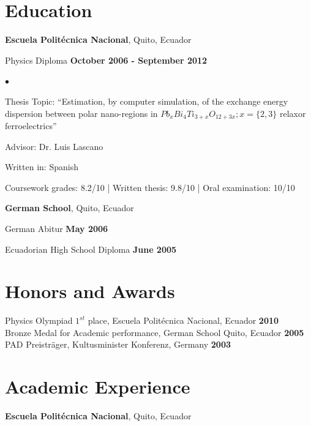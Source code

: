 \documentclass[margin,line]{res}
\newenvironment{list1}{
  \begin{list}{\ding{113}}{%
      \setlength{\itemsep}{0in}
      \setlength{\parsep}{0in} \setlength{\parskip}{0in}
      \setlength{\topsep}{0in} \setlength{\partopsep}{0in} 
      \setlength{\leftmargin}{0.17in}}}{\end{list}}
\newenvironment{list2}{
  \begin{list}{$\bullet$}{%
      \setlength{\itemsep}{0in}
      \setlength{\parsep}{0in} \setlength{\parskip}{0in}
      \setlength{\topsep}{0in} \setlength{\partopsep}{0in} 
      \setlength{\leftmargin}{0.2in}}}{\end{list}}
\begin{document}
\begin{resume}
\section{\sc Education}
  {\bf Escuela Politécnica Nacional}, Quito, Ecuador\\
  \vspace{-.1in}
  \begin{list1}
    \item[] Physics Diploma \hfill {\bf October 2006 - September 2012}\\
    \begin{list2}
    \vspace{-.1in}
      \item Thesis Topic:  ``Estimation, by computer simulation, of the exchange
	energy dispersion between polar nano-regions in $Pb_xBi_4Ti_{3+x}O_{12+3x}; x=\{2,3\}$
	relaxor ferroelectrics''
      \item Advisor: Dr. Luis Lascano
      \item Written in: Spanish
      \item Coursework grades: 8.2/10 | Written thesis: 9.8/10 | Oral examination: 10/10
    \end{list2}
  \end{list1}

  {\bf German School}, Quito, Ecuador\\
  \vspace{-.1in}
  \begin{list1}
    \item[] German Abitur \hfill {\bf May 2006}
    \item[] Ecuadorian High School Diploma \hfill {\bf June 2005}
  \end{list1}

\section{\sc Honors and Awards}
  Physics Olympiad $1^{st}$ place, Escuela Politécnica Nacional, Ecuador \hfill {\bf 2010}\\
  Bronze Medal for Academic performance, German School Quito, Ecuador \hfill {\bf 2005}\\
  PAD Preisträger, Kultusminister Konferenz, Germany \hfill {\bf 2003}

\section{\sc Academic Experience}
  {\bf Escuela Politécnica Nacional}, Quito, Ecuador
    \vspace{-.3cm}


\end{resume}
\end{document}
